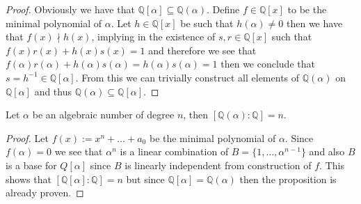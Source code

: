 \begin{proof}
    Obviously we have that \(\mathbb{Q}[\alpha] \subseteq \mathbb{Q}(\alpha)\).
    Define \(f \in \mathbb{Q}[x]\) to be the minimal polynomial of \(\alpha\).
    Let \(h \in \mathbb{Q}[x]\) be such that \(h(\alpha) \neq 0\) then
    we have that \(f(x) \nmid h(x)\), implying in the existence of \(s, r \in
    \mathbb{Q}[x]\) such that \(f(x)r(x) + h(x)s(x) = 1\) and therefore we see
    that \(f(\alpha)r(\alpha) + h(\alpha)s(\alpha) = h(\alpha)s(\alpha) = 1\)
    then we conclude that \(s = h^{-1} \in \mathbb{Q}[\alpha]\). From this we can
    trivially construct all elements of \(\mathbb{Q}(\alpha)\) on
    \(\mathbb{Q}[\alpha]\) and thus \(\mathbb{Q}(\alpha) \subseteq
    \mathbb{Q}[\alpha]\).
\end{proof}

\begin{corollary}
    Let \(\alpha\) be an algebraic number of degree \(n\), then
    \([\mathbb{Q}(\alpha) : \mathbb{Q}] = n\).
\end{corollary}

\begin{proof}
    Let \(f(x) := x^n + \dots + a_0\) be the minimal polynomial of
    \(\alpha\). Since \(f(\alpha) = 0\) we see that \(\alpha^n\) is a linear
    combination of \(B = \{1,\dots,\alpha^{n-1}\}\) and also \(B\) is a base for
    \(Q[\alpha]\) since \(B\) is linearly independent from construction of \(f\).
    This shows that \([\mathbb{Q}[\alpha] : \mathbb{Q}] = n\) but since
    \(\mathbb{Q}[\alpha] = \mathbb{Q}(\alpha)\) then the proposition is already
    proven.
\end{proof}

